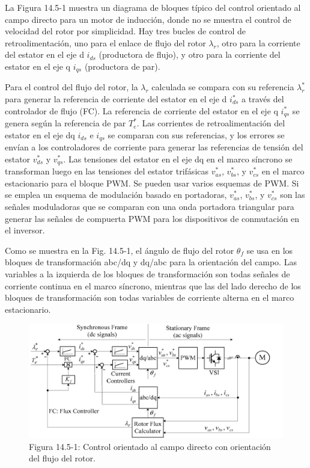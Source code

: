 \documentclass[letterpaper,12pt]{article} %
\begin{document}
La Figura 14.5-1 muestra un diagrama de bloques típico del control orientado al campo directo para un motor de inducción, donde no se muestra el control de velocidad del rotor por simplicidad. Hay tres bucles de control de retroalimentación, uno para el enlace de flujo del rotor \( \lambda_r \), otro para la corriente del estator en el eje d \( i_{ds} \) (productora de flujo), y otro para la corriente del estator en el eje q \( i_{qs} \) (productora de par).

Para el control del flujo del rotor, la \( \lambda_r \) calculada se compara con su referencia \( \lambda_r^* \) para generar la referencia de corriente del estator en el eje d \( i_{ds}^* \) a través del controlador de flujo (FC). La referencia de corriente del estator en el eje q \( i_{qs}^* \) se genera según la referencia de par \( T_e^* \). Las corrientes de retroalimentación del estator en el eje dq \( i_{ds} \) e \( i_{qs} \) se comparan con sus referencias, y los errores se envían a los controladores de corriente para generar las referencias de tensión del estator \( v_{ds}^* \) y \( v_{qs}^* \). Las tensiones del estator en el eje dq en el marco síncrono se transforman luego en las tensiones del estator trifásicas \( v_{as}^* \), \( v_{bs}^* \), y \( v_{cs}^* \) en el marco estacionario para el bloque PWM. Se pueden usar varios esquemas de PWM. Si se emplea un esquema de modulación basado en portadoras, \( v_{as}^* \), \( v_{bs}^* \), y \( v_{cs}^* \) son las señales moduladoras que se comparan con una onda portadora triangular para generar las señales de compuerta PWM para los dispositivos de conmutación en el inversor.

Como se muestra en la Fig. 14.5-1, el ángulo de flujo del rotor \( \theta_f \) se usa en los bloques de transformación abc/dq y dq/abc para la orientación del campo. Las variables a la izquierda de los bloques de transformación son todas señales de corriente continua en el marco síncrono, mientras que las del lado derecho de los bloques de transformación son todas variables de corriente alterna en el marco estacionario.

\begin{figure}[ht]
    \centering
    \includegraphics{graficos/img13.jpg} 
    \caption{Figura 14.5-1: Control orientado al campo directo con orientación del flujo del rotor.}
    \label{fig:14.5-1}
\end{figure}
\FloatBarrier
\end{document}
